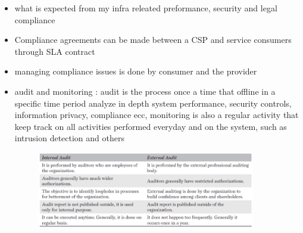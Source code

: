 \documentclass{article}
\begin{document}
\begin{itemize}
\begin{itemize}
        \item what is expected from my infra releated preformance, security and legal compliance
        \item Compliance agreements can be made between a CSP and service consumers through SLA contract
        \item managing compliance issues is done by consumer and the provider
        \item audit and monitoring : audit is the process once a time that offline in a specific time period analyze in depth system  performance, security controls, information privacy, compliance ecc, monitoring is also a regular activity that keep track on all activities performed everyday and on the system, such as intrusion detection and others 
        \begin{figure}[h]
            \centering
            \includegraphics[width=0.90\textwidth]{figure/external_internal_audit.png}
        \end{figure}
    \end{itemize}
\end{itemize}
\end{document}
